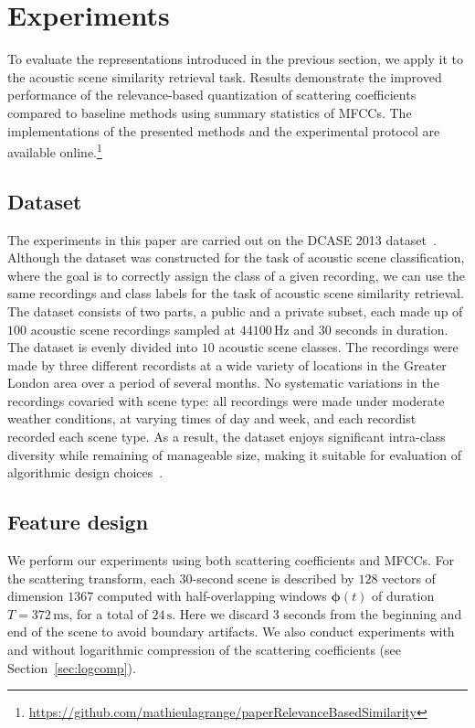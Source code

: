 \documentclass[smallextended]{svjour3}
\begin{document}
\section{Experiments}
\label{sec:experiments}

To evaluate the representations introduced in the previous section, we apply it to the acoustic scene similarity retrieval task.
Results demonstrate the improved performance of the relevance-based quantization of scattering coefficients compared to baseline methods using summary statistics of MFCCs.
The implementations of the presented methods and the experimental protocol are available online.\footnote{\url{https://github.com/mathieulagrange/paperRelevanceBasedSimilarity}}

\subsection{Dataset}

The experiments in this paper are carried out on the DCASE 2013 dataset~\cite{7100934}.
Although the dataset was constructed for the task of acoustic scene classification, where the goal is to correctly assign the class of a given recording, we can use the same recordings and class labels for the task of acoustic scene similarity retrieval.
The dataset consists of two parts, a public and a private subset, each made up of $100$ acoustic scene recordings sampled at $44100\,\mathrm{Hz}$ and $30$ seconds in duration. The dataset is evenly divided into $10$ acoustic scene classes. The recordings were made by three different recordists at a wide variety of locations in the Greater London area over a period of several months. No
systematic variations in the recordings covaried with scene
type: all recordings were made under moderate weather conditions, at varying times of day and week, and each recordist recorded each scene type. As a result, the dataset enjoys significant intra-class diversity while remaining of manageable size, making it suitable for evaluation of algorithmic design choices~\cite{lagrange:hal-01082501}.

\subsection{Feature design}

We perform our experiments using both scattering coefficients and MFCCs. For the scattering transform, each $30$-second scene is described by $128$ vectors of dimension $1367$ computed with half-overlapping windows $\boldsymbol{\phi}(t)$ of duration $T=372\,\mathrm{ms}$, for a total of $24\,\mathrm{s}$. Here we discard $3$ seconds from the beginning and end of the scene to avoid boundary artifacts. We also conduct experiments with and without logarithmic compression of the scattering coefficients (see Section~\ref{sec:logcomp}).
\end{document}
